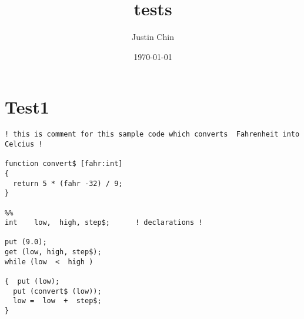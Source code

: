 \documentclass[11pt]{article}
\author{Justin Chin}
\date{\today}
\title{tests}
\begin{document}
\maketitle

\section*{Test1}
\label{sec-1}
\begin{verbatim}
! this is comment for this sample code which converts  Fahrenheit into Celcius !

function convert$ [fahr:int]
{
  return 5 * (fahr -32) / 9;
}

%%
int    low,  high, step$;      ! declarations !

put (9.0);
get (low, high, step$);
while (low  <  high )

{  put (low);
  put (convert$ (low));
  low =  low  +  step$;
}
\end{verbatim}
\end{document}
